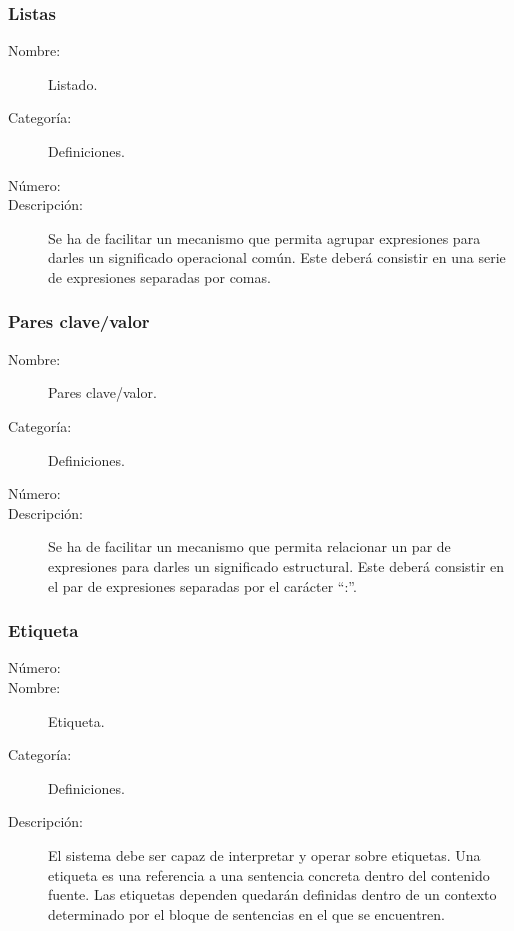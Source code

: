 \subsubsection{Listas}

	\begin{description}
		\item [Nombre:] Listado.
		\item [Categoría:] Definiciones.
		\item [Número:] \cn
		\item [Descripción:] Se ha de facilitar un mecanismo que permita agrupar expresiones para darles un significado operacional
		común. Este deberá consistir en una serie de expresiones separadas por comas.
	\end {description}

\subsubsection{Pares clave/valor}
	\begin{description}
		\item [Nombre:] Pares clave/valor.
		\item [Categoría:] Definiciones.
		\item [Número:] \cn
		\item [Descripción:] Se ha de facilitar un mecanismo que permita relacionar un par de expresiones para darles un significado estructural.
		Este deberá consistir en el par de expresiones separadas por el carácter ``:''.
	\end {description}

\subsubsection{Etiqueta}
	\begin{description}
		\item [Número:] \cn
		\item [Nombre:] Etiqueta.
		\item [Categoría:] Definiciones.
		\item [Descripción:] El sistema debe ser capaz de interpretar y operar sobre etiquetas. Una etiqueta es una referencia
		a una sentencia concreta dentro del contenido fuente. Las etiquetas dependen quedarán definidas dentro de un contexto determinado por
		el bloque de sentencias en el que se encuentren.
	\end {description}

